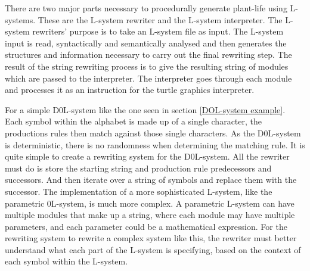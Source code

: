 
\lettrine[lines=3]{T}{}here are two major parts necessary to procedurally generate plant-life using L-systems. These are the L-system rewriter and the L-system interpreter. The L-system rewriters' purpose is to take an L-system file as input. The L-system input is read, syntactically and semantically analysed and then generates the structures and information necessary to carry out the final rewriting step. The result of the string rewriting process is to give the resulting string of modules which are passed to the interpreter. The interpreter goes through each module and processes it as an instruction for the turtle graphics interpreter.

For a simple D0L-system like the one seen in section \ref{DOL-system example}. Each symbol within the alphabet is made up of a single character, the productions rules then match against those single characters. As the D0L-system is deterministic, there is no randomness when determining the matching rule. It is quite simple to create a rewriting system for the D0L-system. All the rewriter must do is store the starting string and production rule predecessors and successors. And then iterate over a string of symbols and replace them with the successor. The implementation of a more sophisticated L-system, like the parametric 0L-system, is much more complex. A parametric L-system can have multiple modules that make up a string, where each module may have multiple parameters, and each parameter could be a mathematical expression. For the rewriting system to rewrite a complex system like this, the rewriter must better understand what each part of the L-system is specifying, based on the context of each symbol within the L-system.

